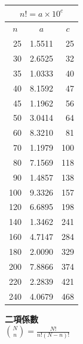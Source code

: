 \begin{minipage}[t]{0.30\textwidth}
\centering\fontsize{7.5pt}{9pt}\selectfont\renewcommand{\arraystretch}{1.0}\setlength{\tabcolsep}{5pt}
\begin{tabular}{|r|c|r|}
\hline
\multicolumn{3}{|c|}{$n! = a \times 10^c$} \\ \hline
\multicolumn{1}{|c|}{$n$} & $a$ & \multicolumn{1}{c|}{$c$} \\ \hline
25 & 1.5511 & 25 \\
30 & 2.6525 & 32 \\
35 & 1.0333 & 40 \\
40 & 8.1592 & 47 \\
45 & 1.1962 & 56 \\
50 & 3.0414 & 64 \\
60 & 8.3210 & 81 \\
70 & 1.1979 & 100 \\
80 & 7.1569 & 118 \\
90 & 1.4857 & 138 \\
100 & 9.3326 & 157 \\
120 & 6.6895 & 198 \\
140 & 1.3462 & 241 \\
160 & 4.7147 & 284 \\
180 & 2.0090 & 329 \\
200 & 7.8866 & 374 \\
220 & 2.2839 & 421 \\
240 & 4.0679 & 468 \\ \hline
\end{tabular}
\end{minipage}

\vspace{0.8em}

\begin{center}
{\large\textbf{二\quad 項\quad 係\quad 數}}\\[0.3em]
$\displaystyle \binom{N}{n} = \frac{N!}{n!(N-n)!}$
\end{center}

\vspace{-0.3em}

